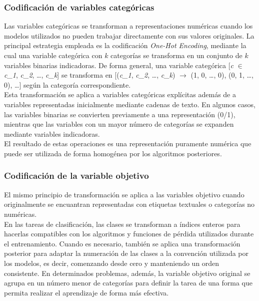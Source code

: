 \documentclass[a4paper,12pt,twoside,final]{book}
\begin{document}
\subsubsection{Codificación de variables categóricas}
Las variables categóricas se transforman a representaciones numéricas cuando los modelos utilizados no pueden trabajar
directamente con sus valores originales. La principal estrategia empleada es la codificación \textit{One-Hot Encoding},
mediante la cual una variable categórica con $k$ categorías se transforma en un conjunto de $k$ variables binarias
indicadoras. De forma general, una variable categórica [\textit{c} $\in$ \textit{c\_1}, \textit{c\_2}, \ldots,
\textit{c\_k}] se transforma en [(\textit{c\_1}, \textit{c\_2}, \ldots, \textit{c\_k}) $\rightarrow$ (1, 0, \ldots, 0),
(0, 1, \ldots, 0), \ldots] según la categoría correspondiente.\\

Esta transformación se aplica a variables categóricas explícitas además de a variables representadas inicialmente
mediante cadenas de texto. En algunos casos, las variables binarias se convierten previamente a una representación
(0/1), mientras que las variables con un mayor número de categorías se expanden mediante variables indicadoras.\\

El resultado de estas operaciones es una representación puramente numérica que puede ser utilizada de forma homogénea
por los algoritmos posteriores.

\subsubsection{Codificación de la variable objetivo}
El mismo principio de transformación se aplica a las variables objetivo cuando originalmente se encuantran
representadas con etiquetas textuales o categorías no numéricas.\\

En las tareas de clasificación, las clases se transforman a índices enteros para hacerlas compatibles con los
algoritmos y funciones de pérdida utilizados durante el entrenamiento. Cuando es necesario, también se aplica una
transformación posterior para adaptar la numeración de las clases a la convención utilizada por los modelos, es decir,
comenzando desde cero y manteniendo un orden consistente. En determinados problemas, además, la variable objetivo
original se agrupa en un número menor de categorías para definir la tarea de una forma que permita realizar el
aprendizaje de forma más efectiva.\\
\end{document}
